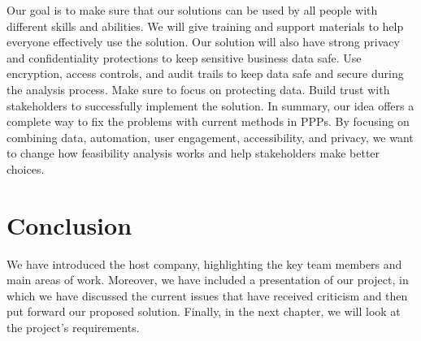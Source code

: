 \vskip 0.5cm
Our goal is to make sure that our solutions can be used by all people with different skills and abilities. We will give training and support materials to help everyone effectively use the solution.
\vskip 0.5cm
Our solution will also have strong privacy and confidentiality protections to keep sensitive business data safe. Use encryption, access controls, and audit trails to keep data safe and secure during the analysis process. Make sure to focus on protecting data. Build trust with stakeholders to successfully implement the solution.
\vskip 0.5cm
In summary, our idea offers a complete way to fix the problems with current methods in PPPs.
By focusing on combining data, automation, user engagement, accessibility, and privacy, we want to change how feasibility analysis works and help stakeholders make better choices.
\section{Conclusion}
We have introduced the host company, highlighting the key team members and main areas of work. Moreover, we have included a presentation of our project, in which we have discussed the current issues that have received criticism and then put forward our proposed solution. Finally, in the next chapter, we will look at the project's requirements.